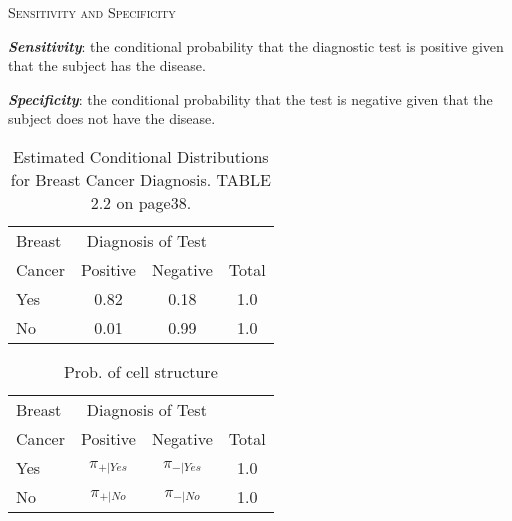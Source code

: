 \documentclass[dvipdfmx, serif,handout]{beamer}
\begin{document}
\begin{frame}{\textsc{Sensitivity and Specificity}}

	\bi
	\item {\bf{\em Sensitivity}}: the conditional probability that the diagnostic test is positive given that the subject has the disease.
	\item {\bf{\em Specificity}}: the conditional probability that the test is negative given that the subject does not have the disease.
		{\scriptsize
			\begin{table}
				\renewcommand{\arraystretch}{1.0}
				\begin{tabular}{lccc}                                                            \\ \hline
					Breast & \multicolumn{2}{c}{Diagnosis of Test}                    \\ \cline{2-3}
					Cancer & Positive                              & Negative & Total \\ \hline
					Yes    & 0.82                                  & 0.18     & 1.0   \\
					No     & 0.01                                  & 0.99     & 1.0   \\ \hline
				\end{tabular}
				\caption{\scriptsize Estimated Conditional Distributions for Breast Cancer Diagnosis. TABLE 2.2 on page38.}
			\end{table}
		}
		{\scriptsize
			\begin{table}
				\renewcommand{\arraystretch}{1.0}
				\begin{tabular}{lccc}                                                                 \\ \hline
					Breast & \multicolumn{2}{c}{Diagnosis of Test}                         \\ \cline{2-3}
					Cancer & Positive                              & Negative      & Total \\ \hline
					Yes    & $\pi_{+|Yes}$                         & $\pi_{-|Yes}$ & 1.0   \\
					No     & $\pi_{+|No}$                          & $\pi_{-|No}$  & 1.0   \\ \hline
				\end{tabular}
				\caption{\scriptsize Prob. of cell structure}
			\end{table}
		}


	\ei

\end{frame}
\end{document}
